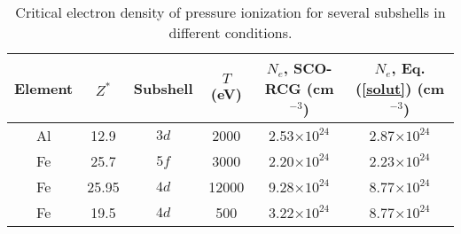 \documentclass[a4paper,10pt]{article}
\begin{document}
\begin{table}[ht]
\begin{center}
\begin{tabular}{|c|c|c|c|c|c|}\hline
Element & $Z^*$ & Subshell & \;\;$T$ (eV)\;\; & \;\;$N_e$, SCO-RCG (cm$^{-3}$)\;\; & $N_e$, Eq. (\ref{solut}) (cm$^{-3}$) \\\hline
Al & 12.9 & $3d$ & 2000 & 2.53$\times 10^{24}$ & 2.87$\times 10^{24}$\\
Fe & 25.7 & $5f$ & 3000 & 2.20$\times 10^{24}$ & 2.23$\times 10^{24}$\\
Fe & 25.95 & $4d$ & 12000 & 9.28$\times 10^{24}$ & 8.77$\times 10^{24}$\\
Fe & 19.5 & $4d$ & 500 & 3.22$\times 10^{24}$ & 8.77$\times 10^{24}$\\\hline
\end{tabular}
\end{center}\caption{Critical electron density of pressure ionization for several subshells in different conditions.}\label{crit}
\end{table}
\end{document}
